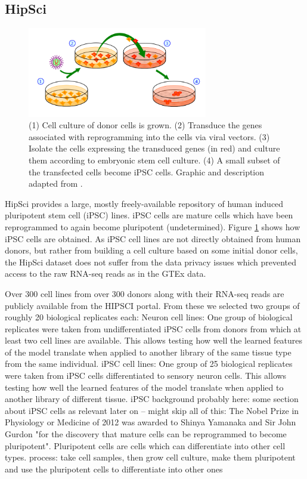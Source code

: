 \subsection{HipSci} \label{subsec:hipsci}
\begin{figure}
	\centering\includegraphics[width=0.7\textwidth]{../visualizations/ch4-methods/ipscprocess.png} 
	\caption[test.]{
	(1) Cell culture of donor cells is grown. (2) Transduce the genes associated with reprogramming into the cells via viral vectors. (3) Isolate the cells expressing the transduced genes (in red) and culture them according to embryonic stem cell culture. (4) A small subset of the transfected cells become iPSC cells. Graphic and description adapted from \cite{img:ipscprocess}.
}
	\label{fig:ipscprocess}
\end{figure}

HipSci provides a large, mostly freely-available repository of human induced pluripotent stem cell (iPSC) lines. iPSC cells are mature cells which have been reprogrammed to again become pluripotent (undetermined). Figure \ref{fig:ipscprocess} shows how iPSC cells are obtained. As iPSC cell lines are not directly obtained from human donors, but rather from building a cell culture based on some initial donor cells, the HipSci dataset does not suffer from the data privacy issues which prevented access to the raw RNA-seq reads as in the GTEx data.


Over 300 cell lines from over 300 donors along with their RNA-seq reads are publicly available from the HIPSCI portal. From these we selected two groups of roughly 20 biological replicates each:
Neuron cell lines: One group of biological replicates were taken from undifferentiated iPSC cells from donors from which at least two cell lines are available. This allows testing how well the learned features of the model translate when applied to another library of the same tissue type from the same individual.
iPSC cell lines: One group of 25 biological replicates were taken from iPSC cells differentiated to sensory neuron cells. This allows testing how well the learned features of the model translate when applied to another library of different tissue.
iPSC background probably here:
some section about iPSC cells as relevant later on -- might skip all of this:
The Nobel Prize in Physiology or Medicine of 2012 was awarded to Shinya Yamanaka and Sir John Gurdon "for the discovery that mature cells can be reprogrammed to become pluripotent". Pluripotent cells are cells which can differentiate into other cell types.
process: take cell samples, then grow cell culture, make them pluripotent and use the pluripotent cells to differentiate into other ones
